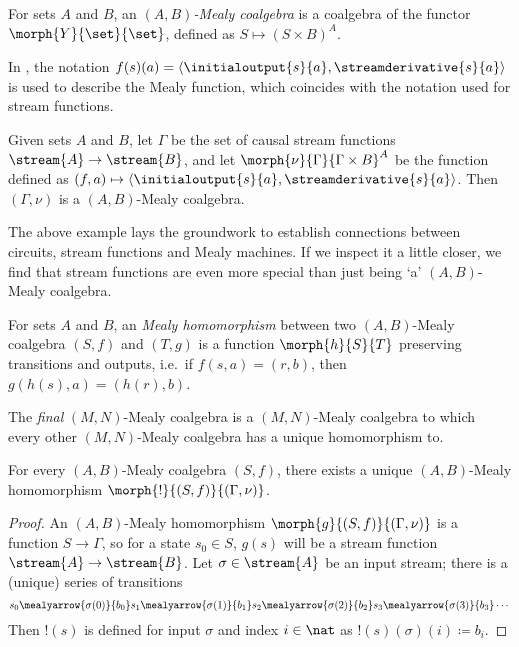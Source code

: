 \begin{definition}
    For sets \(A\) and \(B\), an \emph{\((A,B)\)-Mealy coalgebra} is a coalgebra
    of the functor \(\morph{Y}{\set}{\set}\), defined as
    \(S \mapsto (S \times B)^A\).
\end{definition}

\begin{example}
    In \cite{bonsangue2008coalgebraic}, the notation \(
    f(s)(a) = \langle{\initialoutput{s}{a},\streamderivative{s}{a}}\rangle
    \) is used to describe the Mealy function, which coincides with the notation
    used for stream functions.

    Given sets \(A\) and \(B\), let \(\Gamma\) be the set of causal stream
    functions \(\stream{A} \to \stream{B}\), and let
    \(\morph{\nu}{\Gamma}{\Gamma \times B}^A\) be the function defined as \(
    (f, a) \mapsto \langle{\initialoutput{s}{a},\streamderivative{s}{a}}\rangle
    \).
    Then \((\Gamma,\nu)\) is a \((A,B)\)-Mealy coalgebra.
\end{example}

The above example lays the groundwork to establish connections between circuits,
stream functions and Mealy machines.
If we inspect it a little closer, we find that stream functions are even more
special than just being `a' \((A,B)\)-Mealy coalgebra.

\begin{definition}\label{def:mealy-homomorphism}
    For sets \(A\) and \(B\), an \emph{Mealy homomorphism} between two
    \((A,B)\)-Mealy coalgebra \((S,f)\) and \((T,g)\) is a function
    \(\morph{h}{S}{T}\) preserving transitions and
    outputs, i.e.\ if \(f(s,a) = (r,b)\), then \(g(h(s),a) = (h(r),b)\).
\end{definition}

The \emph{final} \((M,N)\)-Mealy coalgebra is a \((M,N)\)-Mealy coalgebra to
which every other \((M,N)\)-Mealy coalgebra has a unique homomorphism to.

\begin{proposition}
    \label{prop:final-coalgebra}
    For every \((A,B)\)-Mealy coalgebra \((S,f)\), there exists a
    unique \((A,B)\)-Mealy homomorphism \(\morph{{!}}{(S,f)}{(\Gamma,\nu)}\).
\end{proposition}
\begin{proof}
    An \((A,B)\)-Mealy homomorphism \(\morph{g}{(S, f)}{(\Gamma, \nu)}\) is a
    function \(S \to \Gamma\), so for a state \(s_0 \in S\), \(g(s)\) will be a
    stream function \(\stream{A} \to \stream{B}\).
    Let \(\sigma \in \stream{A}\) be an input stream; there is a (unique) series
    of transitions \[
        s_0
        \mealyarrow{\sigma(0)}{b_0}
        s_1
        \mealyarrow{\sigma(1)}{b_1}
        s_2
        \mealyarrow{\sigma(2)}{b_2}
        s_3
        \mealyarrow{\sigma(3)}{b_3}
        \cdots
    \]
    Then \(!(s)\) is defined for input \(\sigma\) and
    index \(i \in \nat\) as \(!(s)(\sigma)(i) \coloneqq b_i\).
\end{proof}

